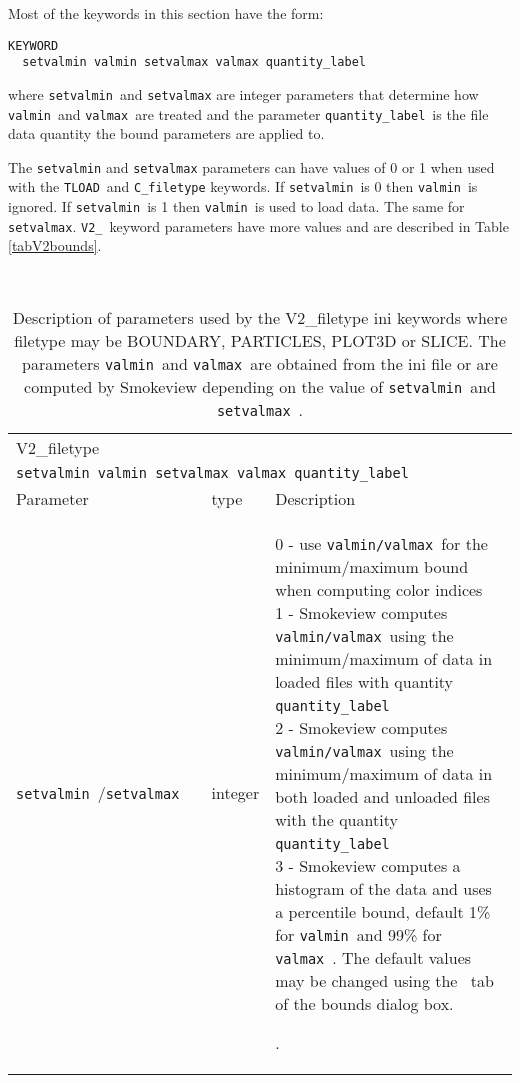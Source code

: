 \documentclass[11pt,twoside]{book}
\begin{document}
{\begin{enumerate}
\end{enumerate}

\noindent Most of the keywords in this section have the form:
\begin{lstlisting}
KEYWORD
  setvalmin valmin setvalmax valmax quantity_label
\end{lstlisting}
\noindent where {\tt setvalmin}\ and {\tt setvalmax} are integer parameters
that determine how {\tt valmin}\ and {\tt valmax}\
are treated and the parameter {\tt quantity\_label}\ is the
file data quantity the bound parameters are applied to.

The {\tt setvalmin} and {\tt setvalmax} parameters can have values of  0 or 1 when used with
the {\tt TLOAD}\ and {\tt C\_filetype} keywords.
If {\tt setvalmin}\ is 0 then {\tt valmin}\ is ignored.
If {\tt setvalmin}\ is 1 then {\tt valmin}\ is used to load data.
The same for {\tt setvalmax}.
{\tt V2\_}\ keyword parameters have more values and are described in  Table \ref{tabV2bounds}.

\newcommand{\tabentry}[1]{\parbox[c]{3.5in}{\vspace{0.05in}#1\vspace{0.05in}}}
\begin{table}[bph]
\begin{center}
\caption[Description of parameters used by the V2\_filetype ini keywords.]
{Description of parameters used by the V2\_filetype  ini keywords where filetype may be
BOUNDARY, PARTICLES, PLOT3D or SLICE. The parameters {\tt valmin}\  and {\tt valmax}\  are obtained from
the ini file or are computed by Smokeview depending on the
value of {\tt setvalmin}\  and {\tt setvalmax}\ .}\ \vspace{0.1in}
\begin{tabular}{|l|l|l|}
\multicolumn{3}{l}{{V2\_filetype}} \\
\multicolumn{3}{l}{{\tt setvalmin valmin setvalmax valmax quantity\_label} } \\
\hline Parameter &  type & Description  \\
\hline {\tt setvalmin}\ /{\tt set{\tt valmax}\ }\  &  integer & \tabentry{
0 - use {\tt valmin/valmax}\  for the minimum/maximum bound when computing color indices\\
1 - Smokeview computes {\tt valmin/valmax}\  using the minimum/maximum of data in loaded files
with quantity {\tt quantity\_label}\  \\
2 - Smokeview computes {\tt valmin/valmax}\  using the minimum/maximum of data in both loaded and unloaded files
with the quantity {\tt quantity\_label}\  \\
3 - Smokeview computes a histogram of the data and uses a percentile bound, default 1\%
for {\tt valmin}\  and 99\% for {\tt valmax}\ .
The default values may be changed using the
  \ tab of the bounds dialog box.
}.  \\


\end{tabular}
\end{center}
\end{table}}
\end{document}
